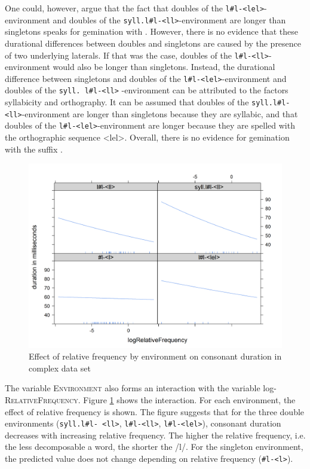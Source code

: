 One could, however, argue that the fact that doubles of the \texttt{l\#l-<lel>}- environment and doubles of the \texttt{syll.l\#l-<ll>}-environment are  longer than singletons speaks for gemination with . However, there is no evidence that these durational differences between doubles and singletons are caused by the presence of two underlying laterals. If that was the case, doubles of the \texttt{l\#l-<ll>}-environment would also be longer than singletons. 
Instead, the durational difference between singletons and doubles of the \texttt{l\#l-<lel>}-environment and doubles of the \texttt{syll. l\#l-<ll>} -environment can be attributed to the factors syllabicity and orthography. It can be assumed that doubles of the  \texttt{syll.l\#l-<ll>}-environment are longer than singletons because they are syllabic, and that doubles of the  \texttt{l\#l-<lel>}-environment are longer because they are spelled with the orthographic sequence <lel>. 
 Overall, there is no evidence for gemination with the suffix .


\begin{figure} [b!]
	\centering
	\includegraphics [scale=0.5] {images/Experiment/LyModelInterRelFreqEnv}
	\caption{Effect of relative frequency by environment on consonant duration in complex data set}
	\label{fig:Rel Env lyComplex experiment}
	
\end{figure}



The variable \textsc{Environment} also forms an interaction with the variable log- \textsc{RelativeFrequency}. Figure \ref{fig:Rel Env lyComplex experiment} shows the interaction. For each environment, the effect of relative frequency is shown. 
The figure suggests that for the three double environments (\texttt{syll.l\#l- <ll>}, \texttt{l\#l-<ll>}, \texttt{l\#l-<lel>}), consonant duration decreases with increasing relative frequency. The higher the relative frequency, i.e. the less decomposable a word, the shorter the /l/. For the singleton environment, the predicted value does not change depending on relative frequency (\texttt{\#l-<l>}).




